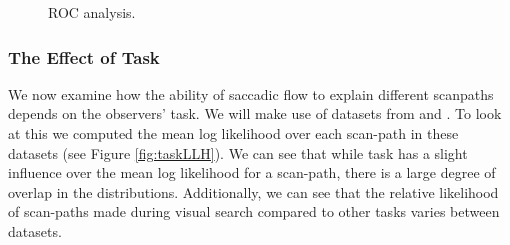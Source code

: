\documentclass[a4paper, twocolumn, oneside, 11pt]{article}
\begin{document}
\begin{figure}
\centering
{}
\caption{ROC analysis.}
\label{fig:nFlowROC}
\end{figure}


\subsubsection{The Effect of Task}

We now examine how the ability of saccadic flow to explain different scanpaths depends on the observers' task. We will make use of datasets from \cite{mills2011} and \cite{koehler2014}. To look at this we computed the mean log likelihood over each scan-path in these datasets (see Figure \ref{fig:taskLLH}). We can see that while task has a slight influence over the mean log likelihood for a scan-path, there is a large degree of overlap in the distributions. Additionally, we can see that the relative likelihood of scan-paths made during visual search compared to other tasks varies between datasets.
\end{document}
